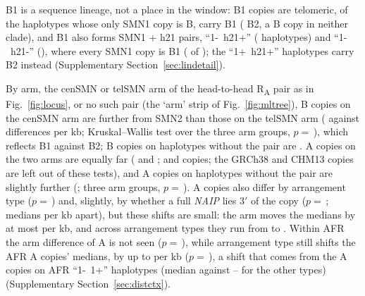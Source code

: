 \documentclass[10pt]{article}
\newcommand{\RU}[1]{R\textsubscript{#1}}%
\begin{document}
B1 is a sequence lineage, not a place in the window:
\linBoneTel{} B1 copies are telomeric, of the \linMkSingleB{} haplotypes whose only SMN1 copy is B, \linMkSingleBone{} carry B1 (\linMkSingleBtwo{} B2, \linMkSingleBnone{} a B copy in neither clade), and B1 also
forms SMN1 + h21 pairs, ``1-~h21+'' (\ldHtwoOnePlusN{} haplotypes) and ``1-~h21-'' (\ldHtwoOneMinusN), where every SMN1 copy is B1 (\ldHtwoOneBOne{} of \ldHtwoOneN); the \ldOnePHtwoOneN{} ``1+~h21+'' haplotypes carry B2 instead (Supplementary
Section~\ref{sec:lindetail}).

By arm, the cenSMN or telSMN arm of the head-to-head \RU{A} pair as in Fig.~\ref{fig:locus}, or no such pair (the `arm' strip of Fig.~\ref{fig:mltree}), B copies on the cenSMN arm are further from SMN2 than those on the telSMN arm (\dcBArmCen{} against \dcBArmTel{} differences per kb; Kruskal--Wallis test over the three arm groups, $p=$\,\dcPBArm), which reflects B1 against B2; B copies on haplotypes without the pair are \dcBArmNo. A copies on the two arms are equally far (\dcAArmCen{} and \dcAArmTel; \dcAArmCenN{} and \dcAArmTelN{} copies; the GRCh38 and CHM13 copies are left out of these tests), and A copies on haplotypes without the pair are slightly further (\dcAArmNo; three arm groups, $p=$\,\dcPAArm). A copies also differ by arrangement type ($p=$\,\dcPAArr) and, slightly, by whether a full \emph{NAIP} lies 3$'$ of the copy ($p=$\,\dcPANaip; medians \dcANaipSpread{} per kb apart), but these shifts are small: the arm moves the medians by at most \dcArmSpread{} per kb, and across arrangement types they run from \dcAArrMin{} to \dcAArrMax. Within AFR the arm difference of A is not seen ($p=$\,\dcPAfrAArm), while arrangement type still shifts the AFR A copies' medians, by up to \dcAfrArrSpread{} per kb ($p=$\,\dcPAfrAArr), a shift that comes from the \dcAfrArrOneOneN{} A copies on AFR ``1-~1+'' haplotypes (median \dcAfrArrOneOneMed{} against \dcAfrArrOthMin--\dcAfrArrOthMax{} for the other types) (Supplementary Section~\ref{sec:distctx}).
\end{document}
